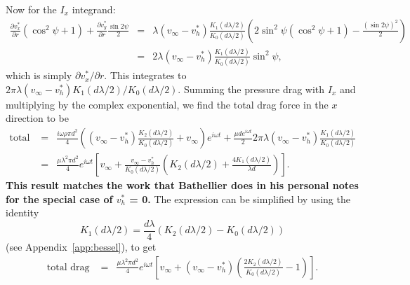 \documentclass[11pt]{amsart}
\newcommand{\vinf}{v_{\infty}}
\newcommand{\om}{\omega}
\newcommand{\bee}[1]{\begin{equation} #1 \end{equation}}
\newcommand{\baas}[1]{\begin{eqnarray*} #1 \end{eqnarray*}}
\newcommand{\pd}[2]{\ensuremath{\frac{\partial #1}{\partial #2}}}
\begin{document}
	Now for the $I_x$ integrand:
	\baas{
	\pd{v_x^*}{r} (\cos^2\psi+1) + \pd{v_y^*}{r}\frac{\sin 2\psi}{2} &=& \lambda (\vinf-v_h^*)\frac{K_1(d\lambda/2)}{K_0(d\lambda/2)}\left( 2\sin^2\psi(\cos^2\psi+1) - \frac{(\sin 2\psi)^2}{2}\right)\\
	&=& 2\lambda (\vinf-v_h^*)\frac{K_1(d\lambda/2)}{K_0(d\lambda/2)}\sin^2\psi,
	}	
	which is simply $\partial v_x^*/\partial r$. This integrates to $2\pi\lambda (\vinf-v_h^*)K_1(d\lambda/2 )/K_0(d\lambda/2)$. Summing the pressure drag with $I_x$ and multiplying by the complex exponential, we find the total drag force in the $x$ direction to be
	\baas{
	\text{total drag } &=& \frac{i \om \rho \pi d^2}{4}\left((\vinf-v_h^*)\frac{K_2(d\lambda/2)}{K_0(d\lambda/2)} + \vinf \right) e^{i \om t} + \frac{\mu d e^{i \om t}}{2}2\pi\lambda (\vinf-v_h^*)\frac{K_1(d\lambda/2 )}{K_0(d\lambda/2)} \\
	&=& \frac{\mu\lambda^2\pi d^2}{4} e^{i \om t} \left[ \vinf + \frac{\vinf-v_h^*}{K_0(d\lambda/2)}\left(K_2(d\lambda/2) + \frac{4 K_1(d\lambda/2)}{\lambda d}\right) \right].
	}
	\textbf{This result matches the work that Bathellier does in his personal notes for the special case of $v_h^*$ = 0.} The expression can be simplified by using the identity 
	\bee{
	K_1(d\lambda/2) = \frac{d\lambda}{4}(K_2(d\lambda/2)-K_0(d\lambda/2)) \label{bessid}
	}
	(see Appendix~\ref{app:bessel}), to get 
	\baas{
	\text{total drag } &=& \frac{\mu\lambda^2\pi d^2}{4} e^{i \om t} \left[ \vinf + (\vinf-v_h^*)\left(\frac{2K_2(d\lambda/2)}{K_0(d\lambda/2)} -1\right) \right].
	}
	
\end{document}
